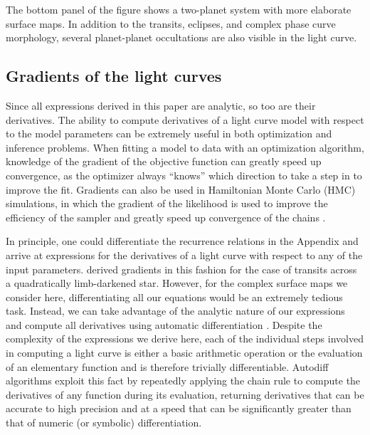 \documentclass[modern]{aastex61}
\begin{document}
The bottom panel of the figure shows a two-planet system with more elaborate
surface maps. In addition to the transits, eclipses, and complex phase curve
morphology, several planet-planet occultations are also visible in the
light curve.

\subsection{Gradients of the light curves}
\label{sec:gradients}
Since all expressions derived in this paper are analytic, so too are their
derivatives. The ability to compute derivatives of a light curve model with
respect to the model parameters can be extremely useful in both optimization
and inference problems. When fitting a model to data with an optimization
algorithm, knowledge of the gradient of the objective function can greatly
speed up convergence, as the optimizer always ``knows'' which direction to
take a step in to improve the fit. Gradients can also be used in Hamiltonian
Monte Carlo (HMC) simulations, in which the gradient of the likelihood is used
to improve the efficiency of the sampler and greatly speed up convergence of
the chains \citep[e.g.,][]{Betancourt2017}.

In principle, one could differentiate the recurrence relations in
the Appendix and arrive at expressions for the derivatives of a light curve with
respect to any of the input parameters. \citet{Pal2008} derived gradients in
this fashion for the case of transits across a quadratically limb-darkened star.
However, for the complex surface maps we consider here, differentiating all our
equations would be an extremely tedious
task. Instead, we can take advantage of the analytic nature of our expressions
and compute all derivatives using automatic differentiation \citep[autodiff; e.g.,][]{Wengert1964}.
Despite the complexity of the expressions we derive here, each of the individual
steps involved in computing a light curve is either a basic arithmetic operation
or the evaluation of an elementary function and is therefore trivially differentiable.
Autodiff algorithms exploit this fact by repeatedly applying the chain rule to
compute the derivatives of any function during its evaluation, returning derivatives
that can be accurate to high precision and at a speed that can be significantly greater
than that of numeric (or symbolic) differentiation.
\end{document}
